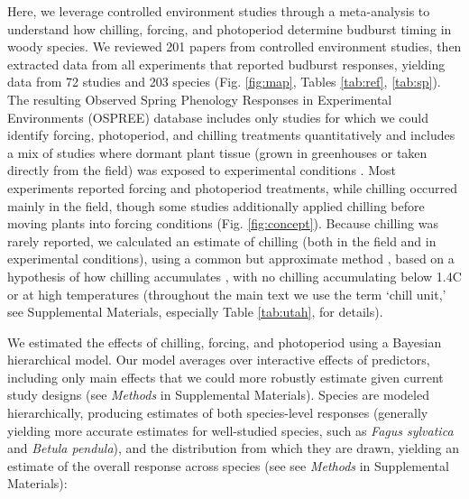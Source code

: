 \documentclass{article}
\begin{document}
\par Here, we leverage controlled environment studies through a meta-analysis to understand how chilling, forcing, and photoperiod determine budburst timing in woody species. We reviewed 201 papers from controlled environment studies, then extracted data from all experiments that reported budburst responses, yielding data from 72 studies and 203 species (Fig. \ref{fig:map}, Tables \ref{tab:ref}, \ref{tab:sp}). The resulting Observed Spring Phenology Responses in Experimental Environments (OSPREE) database includes only studies for which we could identify forcing, photoperiod, and chilling treatments quantitatively and includes a mix of studies where dormant plant tissue (grown in greenhouses or taken directly from the field) was exposed to experimental conditions \emph{\citep{wolkovich2019}}. Most experiments reported forcing and photoperiod treatments, while chilling occurred mainly in the field, though some studies additionally applied chilling before moving plants into forcing conditions (Fig. \ref{fig:concept}). Because chilling was rarely reported, we calculated an estimate of chilling (both in the field and in experimental conditions), using a common but approximate method \emph{\citep{richardson1974}}, based on a hypothesis of how chilling accumulates \citep{dennis2003}, with no chilling accumulating below 1.4\degree C or at high temperatures (throughout the main text we use the term `chill unit,' see Supplemental Materials, especially Table \ref{tab:utah}, for details). 

\par We estimated the effects of chilling, forcing, and photoperiod using a Bayesian hierarchical model. Our model averages over interactive effects of predictors, including only main effects that we could more robustly estimate given current study designs (see \emph{Methods} in Supplemental Materials). Species are modeled hierarchically, producing estimates of both species-level responses (generally yielding more accurate estimates for well-studied species, such as \emph{Fagus sylvatica} and \emph{Betula pendula}), and the distribution from which they are drawn, yielding an estimate of the overall response across species (see see \emph{Methods} in Supplemental Materials): 
\end{document}
